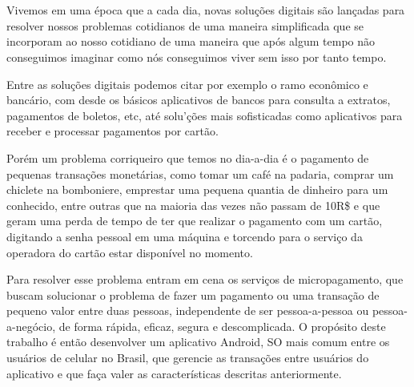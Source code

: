 \documentclass[hidelinks,12pt]{article}
\begin{document}
\section*{}

Vivemos em uma \'epoca que a cada dia, novas solu\c{c}\~oes digitais s\~ao lan\c{c}adas para resolver nossos problemas cotidianos de uma maneira simplificada que se incorporam ao nosso cotidiano de uma maneira que ap\'os algum tempo n\~ao conseguimos imaginar como n\'os conseguimos viver sem isso por tanto tempo.

Entre as solu\c{c}\~oes digitais podemos citar por exemplo o ramo econ\^omico e banc\'ario, com desde os b\'asicos aplicativos de bancos para consulta a extratos, pagamentos de boletos, etc, at\'e solu'\c{c}\~oes mais sofisticadas como aplicativos para receber e processar pagamentos por cart\~ao.

Por\'em um problema corriqueiro que temos no dia-a-dia \'e o pagamento de pequenas transa\c{c}\~oes monet\'arias, como tomar um caf\'e na padaria, comprar um chiclete na bomboniere, emprestar uma pequena quantia de dinheiro para um conhecido, entre outras que na maioria das vezes n\~ao passam de 10R\$ e que geram uma perda de tempo de ter que realizar o pagamento com um cart\~ao, digitando a senha pessoal em uma m\'aquina e torcendo para o servi\c{c}o da operadora do cart\~ao estar disponível no momento.

Para resolver esse problema entram em cena os servi\c{c}os de micropagamento, que buscam solucionar o problema de fazer um pagamento ou uma transa\c{c}\~ao de pequeno valor entre duas pessoas, independente de ser pessoa-a-pessoa ou pessoa-a-neg\'ocio, de forma r\'apida, eficaz, segura e descomplicada. O prop\'osito deste trabalho \'e ent\~ao desenvolver um aplicativo Android, SO mais comum entre os usu\'arios de celular no Brasil, que gerencie as transações entre usu\'arios do aplicativo e que fa\c{c}a valer as caracter\'isticas descritas anteriormente.
\newline
\end{document}
